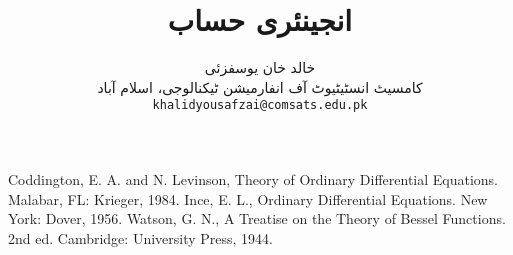 \documentclass[leqno,b5paper]{book}
\author{
خالد خان یوسفزئی\\
{\small {کامسیٹ انسٹیٹیوٹ آف انفارمیشن ٹیکنالوجی، اسلام آباد}}\\
\texttt{khalidyousafzai@comsats.edu.pk}
}
\title{انجینئری حساب}
\date{}                           %
\begin{document}
\begin{urdufont}


\renewcommand*{\contentsname}{عنوان}    %
\renewcommand*{\proofname}{ثبوت}   %
\renewcommand*{\appendixname}{ضمیمہ}


\frontmatter                          %

\maketitle

\tableofcontents
\pagestyle{empty}
\newpage

\newpage

%


\mainmatter                      %
\renewcommand*{\chaptername}{باب}

\pagestyle{headings}










\renewcommand*{\bibname}{حوالہ}      %
\begin{thebibliography}{99}\label{حوالہ_بیرونی_مواد}
\begin{otherlanguage}{english}
 Coddington, E. A. and N. Levinson, Theory of
Ordinary Differential Equations. Malabar, FL: Krieger,
1984.
Ince, E. L., Ordinary Differential Equations. New
York: Dover, 1956.
Watson, G. N., A Treatise on the Theory of Bessel Functions. 2nd ed. Cambridge: University Press, 1944.
\end{otherlanguage}
\end{thebibliography}
\appendix


%


\end{urdufont}
\end{document}
